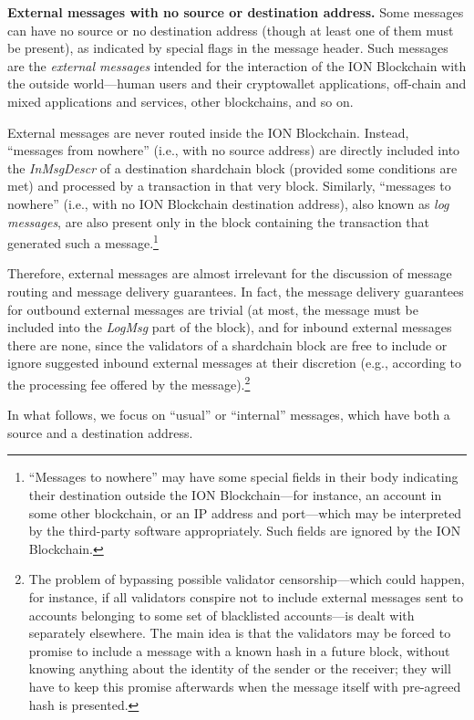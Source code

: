 \documentclass[12pt,oneside]{article}
\def\makepoint#1{\medbreak\noindent{\bf #1.\ }}
\def\nxsubpoint{\refstepcounter{subsubsection}%
  \smallbreak\makepoint{\thesubsubsection}}
\def\emb#1{\textbf{#1.}}
\begin{document}
\nxsubpoint\emb{External messages with no source or destination address}
Some messages can have no source or no destination address (though at least one of them must be present), as indicated by special flags in the message header. Such messages are the {\em external messages} intended for the interaction of the ION Blockchain with the outside world---human users and their cryptowallet applications, off-chain and mixed applications and services, other blockchains, and so on.

External messages are never routed inside the ION Blockchain. Instead, ``messages from nowhere'' (i.e., with no source address) are directly included into the \textit{InMsgDescr\/} of a destination shardchain block (provided some conditions are met) and processed by a transaction in that very block. Similarly, ``messages to nowhere'' (i.e., with no ION Blockchain destination address), also known as {\em log messages}, are also present only in the block containing the transaction that generated such a message.\footnote{``Messages to nowhere'' may have some special fields in their body indicating their destination outside the ION Blockchain---for instance, an account in some other blockchain, or an IP address and port---which may be interpreted by the third-party software appropriately. Such fields are ignored by the ION Blockchain.}

Therefore, external messages are almost irrelevant for the discussion of message routing and message delivery guarantees. In fact, the message delivery guarantees for outbound external messages are trivial (at most, the message must be included into the \textit{LogMsg} part of the block), and for inbound external messages there are none, since the validators of a shardchain block are free to include or ignore suggested inbound external messages at their discretion (e.g., according to the processing fee offered by the message).\footnote{The problem of bypassing possible validator censorship---which could happen, for instance, if all validators conspire not to include external messages sent to accounts belonging to some set of blacklisted accounts---is dealt with separately elsewhere. The main idea is that the validators may be forced to promise to include a message with a known hash in a future block, without knowing anything about the identity of the sender or the receiver; they will have to keep this promise afterwards when the message itself with pre-agreed hash is presented.}

In what follows, we focus on ``usual'' or ``internal'' messages, which have both a source and a destination address.
\end{document}
